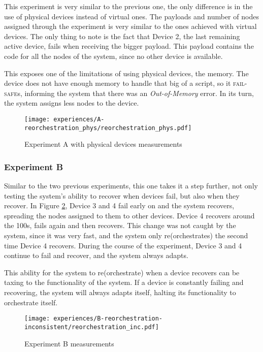 This experiment is very similar to the previous one, the only difference is in the use of physical devices instead of virtual ones. The payloads and number of nodes assigned through the experiment is very similar to the ones achieved with virtual devices. The only thing to note is the fact that Device 2, the  last remaining active device, fails when receiving the bigger payload. This payload contains the code for all the nodes of the system, since no other device is available. 

This exposes one of the limitations of using physical devices, the memory. The device does not have enough memory to handle that big of a script, so it \textsc{fail-safe}s, informing the system that there was an \textit{Out-of-Memory} error. In its turn, the system assigns less nodes to the device.

\begin{figure}[h]
\centering
\texttt{[image: experiences/A-reorchestration\_phys/reorchestration\_phys.pdf]}
\caption[Experiment A with physical devices measurements]{Experiment A with physical devices measurements}\label{fig:experiment_a_phys_graph}
\end{figure}


\subsubsection{Experiment B}

Similar to the two previous experiments, this one takes it a step further, not only testing the system's ability to recover when devices fail, but also when they recover. In Figure \ref{fig:experiment_b_graph}, Device 3 and 4 fail early on and the system recovers, spreading the nodes assigned to them to other devices. Device 4 recovers around the 100s, fails again and then recovers. This change was not caught by the system, since it was very fast, and the system only re(orchestrates) the second time Device 4 recovers. During the course of the experiment, Device 3 and 4 continue to fail and recover, and the system always adapts.

This ability for the system to re(orchestrate) when a device recovers can be taxing to the functionality of the system. If a device is constantly failing and recovering, the system will always adapts itself, halting its functionality to orchestrate itself.

\begin{figure}[h]
\centering
\texttt{[image: experiences/B-reorchestration-inconsistent/reorchestration\_inc.pdf]}
\caption[Experiment B measurements]{Experiment B measurements}\label{fig:experiment_b_graph}
\end{figure}

